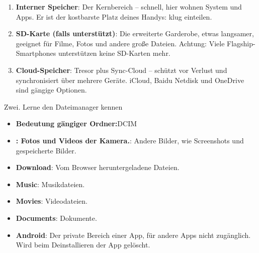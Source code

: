 


\begin{enumerate}
  \item \textbf{Interner Speicher}: Der Kernbereich – schnell, hier wohnen System und Apps. Er ist der kostbarste Platz deines Handys: klug einteilen.
  \item \textbf{SD-Karte (falls unterstützt)}: Die erweiterte Garderobe, etwas langsamer, geeignet für Filme, Fotos und andere große Dateien. Achtung: Viele Flagship-Smartphones unterstützen keine SD-Karten mehr.
  \item \textbf{Cloud-Speicher}: Tresor plus Sync-Cloud – schützt vor Verlust und synchronisiert über mehrere Geräte. iCloud, Baidu Netdisk und OneDrive sind gängige Optionen.
\end{enumerate}


Zwei. Lerne den Dateimanager kennen


\begin{itemize}
  \item \textbf{Bedeutung gängiger Ordner:}DCIM
  \item \textbf{: Fotos und Videos der Kamera.}: Andere Bilder, wie Screenshots und gespeicherte Bilder.
  \item \textbf{Download}: Vom Browser heruntergeladene Dateien.
  \item \textbf{Music}: Musikdateien.
  \item \textbf{Movies}: Videodateien.
  \item \textbf{Documents}: Dokumente.
  \item \textbf{Android}: Der private Bereich einer App, für andere Apps nicht zugänglich. Wird beim Deinstallieren der App gelöscht.
\end{itemize}

